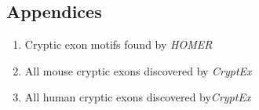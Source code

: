 \documentclass[a4paper,11pt,twoside]{report}
\begin{document}
%



\begin{appendices}
	\section*{Appendices}
	\begin{enumerate}
	\item Cryptic exon motifs found by \textit{HOMER}\\
	\item All mouse cryptic exons discovered by \textit{CryptEx}\\ 
	\item All human cryptic exons discovered by\textit{CryptEx}\\
	\end{enumerate}


%
\end{appendices}
\cleardoublepage
\end{document}
